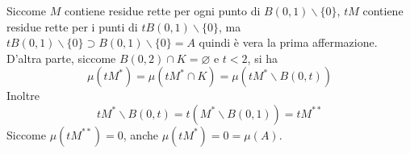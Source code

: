 \documentclass[11pt]{beamer} %
\newcommand{\<}{\langle}
\renewcommand{\>}{\rangle}
\theoremstyle{theorem}
\theoremstyle{theorem}
\theoremstyle{theorem}
\theoremstyle{theorem}
\theoremstyle{theorem}
\begin{document}
\begin{frame}
Siccome $M$ contiene residue rette per ogni punto di $B(0,1) \backslash\{0\}$, $t M$ contiene residue rette per i punti di $t B(0,1) \backslash\{0\}$, ma $t B(0,1) \backslash\{0\} \supset B(0,1) \backslash\{0\}=A$ quindi è vera la prima affermazione.\\
D'altra parte, siccome $B(0,2) \cap K=\varnothing$ e $t<2$, si ha
$$
\mu\left(t M^{*}\right)=\mu\left(t M^{*} \cap K\right)=\mu\left(t M^{*} \backslash B(0, t)\right)
$$
Inoltre
$$
t M^{*} \backslash B(0, t)=t\left(M^{*} \backslash B(0,1)\right)=t M^{* *}
$$
Siccome $\mu\left(t M^{* *}\right)=0$, anche $\mu (tM^*)= 0= \mu(A)$.

\end{frame}
\end{document}
